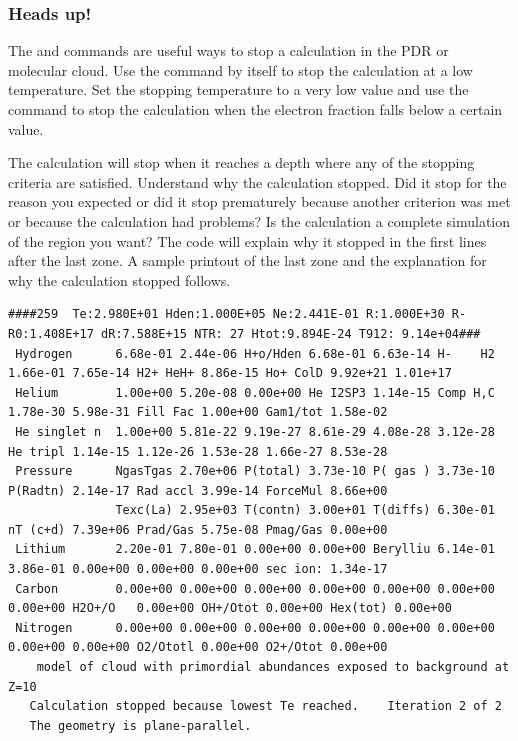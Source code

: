 \documentclass[12pt,twoside]{article}
\begin{document}
{\subsubsection{Heads up!}

The  and 
commands are useful ways to stop
a calculation in the PDR or molecular cloud.
Use the 
command by itself to stop the calculation at a low temperature.
Set the stopping temperature to a very low value
and use the  command
to stop the calculation when the electron fraction falls below a certain
value.

The calculation will stop when it reaches a depth where any of the
stopping criteria are satisfied.
Understand why the calculation stopped.
Did it stop for the reason you expected or did it stop prematurely because
another criterion was met or because the calculation had problems?  Is the
calculation a complete simulation of the region you want?  The code will
explain why it stopped in the first lines after the last zone.
A sample printout of the last zone and the explanation for why the calculation stopped follows.

\label{sec:ZoneOutput}
{\setverbatimfontsize{\tiny}
\begin{verbatim}
####259  Te:2.980E+01 Hden:1.000E+05 Ne:2.441E-01 R:1.000E+30 R-R0:1.408E+17 dR:7.588E+15 NTR: 27 Htot:9.894E-24 T912: 9.14e+04###
 Hydrogen      6.68e-01 2.44e-06 H+o/Hden 6.68e-01 6.63e-14 H-    H2 1.66e-01 7.65e-14 H2+ HeH+ 8.86e-15 Ho+ ColD 9.92e+21 1.01e+17
 Helium        1.00e+00 5.20e-08 0.00e+00 He I2SP3 1.14e-15 Comp H,C 1.78e-30 5.98e-31 Fill Fac 1.00e+00 Gam1/tot 1.58e-02
 He singlet n  1.00e+00 5.81e-22 9.19e-27 8.61e-29 4.08e-28 3.12e-28 He tripl 1.14e-15 1.12e-26 1.53e-28 1.66e-27 8.53e-28
 Pressure      NgasTgas 2.70e+06 P(total) 3.73e-10 P( gas ) 3.73e-10 P(Radtn) 2.14e-17 Rad accl 3.99e-14 ForceMul 8.66e+00
               Texc(La) 2.95e+03 T(contn) 3.00e+01 T(diffs) 6.30e-01 nT (c+d) 7.39e+06 Prad/Gas 5.75e-08 Pmag/Gas 0.00e+00
 Lithium       2.20e-01 7.80e-01 0.00e+00 0.00e+00 Berylliu 6.14e-01 3.86e-01 0.00e+00 0.00e+00 0.00e+00 sec ion: 1.34e-17
 Carbon        0.00e+00 0.00e+00 0.00e+00 0.00e+00 0.00e+00 0.00e+00 0.00e+00 H2O+/O   0.00e+00 OH+/Otot 0.00e+00 Hex(tot) 0.00e+00
 Nitrogen      0.00e+00 0.00e+00 0.00e+00 0.00e+00 0.00e+00 0.00e+00 0.00e+00 0.00e+00 O2/Ototl 0.00e+00 O2+/Otot 0.00e+00
    model of cloud with primordial abundances exposed to background at Z=10
   Calculation stopped because lowest Te reached.    Iteration 2 of 2
   The geometry is plane-parallel.
\end{verbatim}
}

}
\end{document}
